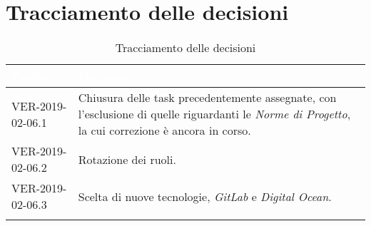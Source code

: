 
\section{Tracciamento delle decisioni}

\begin{longtable}{|C{.40\textwidth}|C{.60\textwidth}|}
\hline
{}\textbf{\textcolor{white}{Codice}} & \textbf{\textcolor{white}{Decisione}}\\
\hline
VER-2019-02-06.1 & Chiusura delle task precedentemente assegnate, con l'esclusione di quelle riguardanti le \textit{Norme di Progetto}, la cui correzione è ancora in corso.\\
\hline
{}VER-2019-02-06.2 & Rotazione dei ruoli. \\
\hline
VER-2019-02-06.3 & Scelta di nuove tecnologie, \textit{GitLab} e \textit{Digital Ocean}. \\
\hline

\caption{Tracciamento delle decisioni}
\end{longtable}

